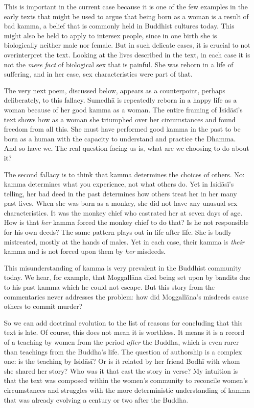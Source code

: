 \documentclass[12pt,openany]{book}%
\begin{document}
This is important in the current case because it is one of the few examples in the early texts that might be used to argue that being born as a woman is a result of bad kamma, a belief that is commonly held in Buddhist cultures today. This might also be held to apply to intersex people, since in one birth she is biologically neither male nor female. But in such delicate cases, it is crucial to not overinterpret the text. Looking at the lives described in the text, in each case it is not the \emph{mere fact} of biological sex that is painful. She was reborn in a life of suffering, and in her case, sex characteristics were part of that.

The very next poem, discussed below, appears as a counterpoint, perhaps deliberately, to this fallacy. \textsanskrit{Sumedhā} is repeatedly reborn in a happy life as a woman because of her good kamma as a woman. The entire framing of \textsanskrit{Isidāsī}’s text shows how as a woman she triumphed over her circumstances and found freedom from all this. She must have performed good kamma in the past to be born as a human with the capacity to understand and practice the Dhamma. And so have we. The real question facing us is, what are we choosing to do about it?

The second fallacy is to think that kamma determines the choices of others. No: kamma determines what you experience, not what others do. Yet in \textsanskrit{Isidāsī}’s telling, her bad deed in the past determines how others treat her in her many past lives. When she was born as a monkey, she did not have any unusual sex characteristics. It was the monkey chief who castrated her at seven days of age. How is that \emph{her} kamma forced the monkey chief to do that? Is he not responsible for his own deeds? The same pattern plays out in life after life. She is badly mistreated, mostly at the hands of males. Yet in each case, their kamma is \emph{their} kamma and is not forced upon them by \emph{her} misdeeds.

This misunderstanding of kamma is very prevalent in the Buddhist community today. We hear, for example, that \textsanskrit{Moggallāna} died being set upon by bandits due to his past kamma which he could not escape. But this story from the commentaries never addresses the problem: how did \textsanskrit{Moggallāna}’s misdeeds cause others to commit murder?

So we can add doctrinal evolution to the list of reasons for concluding that this text is late. Of course, this does not mean it is worthless. It means it is a record of a teaching by women from the period \emph{after} the Buddha, which is even rarer than teachings from the Buddha’s life. The question of authorship is a complex one: is the teaching by \textsanskrit{Isidāsī}? Or is it related by her friend \textsanskrit{Bodhī} with whom she shared her story? Who was it that cast the story in verse? My intuition is that the text was composed within the women’s community to reconcile women’s circumstances and struggles with the more deterministic understanding of kamma that was already evolving a century or two after the Buddha.
\end{document}
